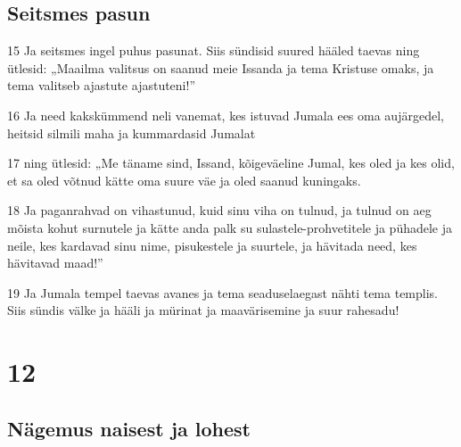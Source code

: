 \section*{Seitsmes pasun}

\par 15 Ja seitsmes ingel puhus pasunat. Siis sündisid suured hääled taevas ning ütlesid: „Maailma valitsus on saanud meie Issanda ja tema Kristuse omaks, ja tema valitseb ajastute ajastuteni!”
\par 16 Ja need kakskümmend neli vanemat, kes istuvad Jumala ees oma aujärgedel, heitsid silmili maha ja kummardasid Jumalat
\par 17 ning ütlesid: „Me täname sind, Issand, kõigeväeline Jumal, kes oled ja kes olid, et sa oled võtnud kätte oma suure väe ja oled saanud kuningaks.
\par 18 Ja paganrahvad on vihastunud, kuid sinu viha on tulnud, ja tulnud on aeg mõista kohut surnutele ja kätte anda palk su sulastele-prohvetitele ja pühadele ja neile, kes kardavad sinu nime, pisukestele ja suurtele, ja hävitada need, kes hävitavad maad!”
\par 19 Ja Jumala tempel taevas avanes ja tema seaduselaegast nähti tema templis. Siis sündis välke ja hääli ja mürinat ja maavärisemine ja suur rahesadu!


\chapter{12}

\section*{Nägemus naisest ja lohest}

